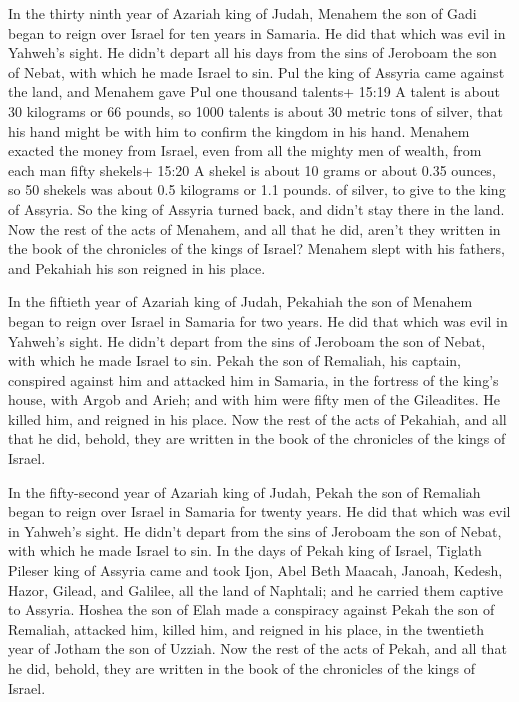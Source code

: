  In the thirty ninth year of Azariah king of Judah, Menahem
the son of Gadi began to reign over Israel for ten years in Samaria.
 He did that which was evil in Yahweh's sight. He didn't
depart all his days from the sins of Jeroboam the son of Nebat, with
which he made Israel to sin.  Pul the king of Assyria came
against the land, and Menahem gave Pul one thousand talents+ 15:19 A
talent is about 30 kilograms or 66 pounds, so 1000 talents is about 30
metric tons of silver, that his hand might be with him to confirm the
kingdom in his hand.  Menahem exacted the money from
Israel, even from all the mighty men of wealth, from each man fifty
shekels+ 15:20 A shekel is about 10 grams or about 0.35 ounces, so 50
shekels was about 0.5 kilograms or 1.1 pounds. of silver, to give to the
king of Assyria. So the king of Assyria turned back, and didn't stay
there in the land.  Now the rest of the acts of Menahem,
and all that he did, aren't they written in the book of the chronicles
of the kings of Israel?  Menahem slept with his fathers,
and Pekahiah his son reigned in his place.

 In the fiftieth year of Azariah king of Judah, Pekahiah
the son of Menahem began to reign over Israel in Samaria for two years.
 He did that which was evil in Yahweh's sight. He didn't
depart from the sins of Jeroboam the son of Nebat, with which he made
Israel to sin.  Pekah the son of Remaliah, his captain,
conspired against him and attacked him in Samaria, in the fortress of
the king's house, with Argob and Arieh; and with him were fifty men of
the Gileadites. He killed him, and reigned in his place. 
Now the rest of the acts of Pekahiah, and all that he did, behold, they
are written in the book of the chronicles of the kings of Israel.

 In the fifty-second year of Azariah king of Judah, Pekah
the son of Remaliah began to reign over Israel in Samaria for twenty
years.  He did that which was evil in Yahweh's sight. He
didn't depart from the sins of Jeroboam the son of Nebat, with which he
made Israel to sin.  In the days of Pekah king of Israel,
Tiglath Pileser king of Assyria came and took Ijon, Abel Beth Maacah,
Janoah, Kedesh, Hazor, Gilead, and Galilee, all the land of Naphtali;
and he carried them captive to Assyria.  Hoshea the son of
Elah made a conspiracy against Pekah the son of Remaliah, attacked him,
killed him, and reigned in his place, in the twentieth year of Jotham
the son of Uzziah.  Now the rest of the acts of Pekah, and
all that he did, behold, they are written in the book of the chronicles
of the kings of Israel.

